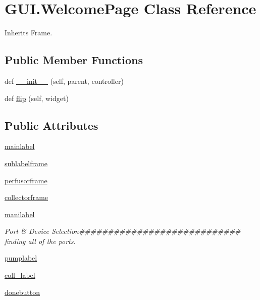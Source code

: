 \hypertarget{class_g_u_i_1_1_welcome_page}{}\section{G\+U\+I.\+Welcome\+Page Class Reference}
\label{class_g_u_i_1_1_welcome_page}


Inherits Frame.

\subsection*{Public Member Functions}
\begin{DoxyCompactItemize}
\item 
def \mbox{\hyperlink{class_g_u_i_1_1_welcome_page_aa88665446973a13fe29a978a1a9962e3}{\+\_\+\+\_\+init\+\_\+\+\_\+}} (self, parent, controller)
\item 
def \mbox{\hyperlink{class_g_u_i_1_1_welcome_page_a7612699922f2f3789aa58e098797b949}{flip}} (self, widget)
\end{DoxyCompactItemize}
\subsection*{Public Attributes}
\begin{DoxyCompactItemize}
\item 
\mbox{\hyperlink{class_g_u_i_1_1_welcome_page_a9e6eeb6f60a722283ce51970482d60c8}{mainlabel}}
\item 
\mbox{\hyperlink{class_g_u_i_1_1_welcome_page_a82599f77f38933702392daab0cf6a396}{sublabelframe}}
\item 
\mbox{\hyperlink{class_g_u_i_1_1_welcome_page_a9228925baaa2dce27b3c403f6dc989fb}{perfusorframe}}
\item 
\mbox{\hyperlink{class_g_u_i_1_1_welcome_page_acac39ff27c299df0066830308db34032}{collectorframe}}
\item 
\mbox{\hyperlink{class_g_u_i_1_1_welcome_page_abbb18b04d5919182a5ab2808cac1f5fa}{manilabel}}
\begin{DoxyCompactList}\small\item\em Port \& Device Selection\#\#\#\#\#\#\#\#\#\#\#\#\#\#\#\#\#\#\#\#\#\#\#\#\#\#\#\# finding all of the ports. \end{DoxyCompactList}\item 
\mbox{\hyperlink{class_g_u_i_1_1_welcome_page_a1760f2af3848183bb73cfec74b78f27c}{pumplabel}}
\item 
\mbox{\hyperlink{class_g_u_i_1_1_welcome_page_a67a73c2b555ee6e4ab9eea5a3048e866}{coll\+\_\+label}}
\item 
\mbox{\hyperlink{class_g_u_i_1_1_welcome_page_a6b31226c328fc95d90de406177cb7db8}{donebutton}}
\end{DoxyCompactItemize}


